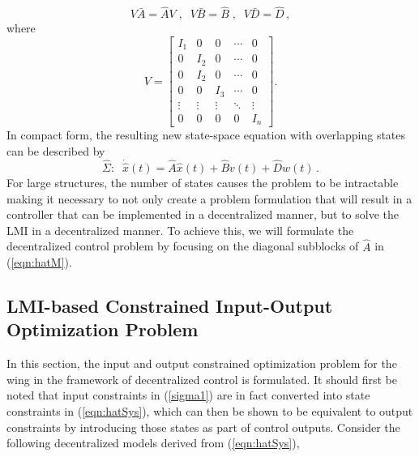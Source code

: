 \documentclass[11pt]{ucthesis}
\begin{document}
\begin{equation}
V \bar{A} = \hat{A}V \;,\;\; V \bar{B} = \hat{B}\;,\;\;V \bar{D} = \hat{D}\,,
\end{equation}
where
\begin{equation}
V = \begin{bmatrix}
I_{1}&0&0&\cdots&0\\
0&I_2&0&\cdots&0\\
0&I_2&0&\cdots&0\\
0&0&I_3&\cdots&0\\
\vdots&\vdots&\vdots&\ddots&\vdots\\
0&0&0&0&I_n
\end{bmatrix} .
\end{equation}
In compact form, the resulting new state-space equation with overlapping states can be described by
\begin{equation}
\hat{\Sigma} : \;\; \dot{\hat{x}}(t) = \hat{A}\hat{x}(t) + \hat{B}v(t) + \hat{D}w(t) \,.
\label{eqn:hatSys}
\end{equation}
For large structures, the number of states causes the problem to be intractable making it necessary to not only create a problem formulation that will result in a controller that can be implemented in a decentralized manner, but to solve the LMI in a decentralized manner. To achieve this, we will formulate the decentralized control problem by focusing on the diagonal subblocks of $\hat{A}$ in (\ref{eqn:hatM}).  

\subsection{LMI-based Constrained Input-Output Optimization Problem}
\label{sec:LMI}
In this section, the input and output constrained optimization problem for the wing in the framework of decentralized control is formulated. It should first be noted that input constraints in (\ref{sigma1}) are in fact converted into state constraints in (\ref{eqn:hatSys}), which can then be shown to be equivalent to output constraints by introducing those states as part of control outputs. Consider the following decentralized models derived from (\ref{eqn:hatSys}),
\end{document}
